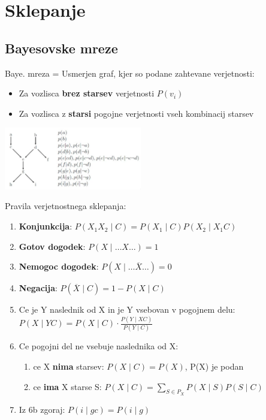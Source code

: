 \section{Sklepanje}

\subsection{Bayesovske mreze}

Baye. mreza = Usmerjen graf, kjer so podane zahtevane verjetnosti:
\begin{itemize}[leftmargin=*,topsep=0pt,noitemsep]
    \item Za vozlisca \textbf{brez starsev} verjetnosti $P(v_i)$
    \item Za vozlisca z \textbf{starsi} pogojne verjetnosti vseh kombinacij starsev
\end{itemize}

\includegraphics[width=6cm]{images/bayesovska_mreza.png}

Pravila verjetnostnega sklepanja:
\begin{enumerate}[leftmargin=*,topsep=0pt,noitemsep]
    \item \textbf{Konjunkcija}: $P(X_1 X_2 \mid C) = P(X_1 \mid C) P(X_2 \mid X_1C)$
    \item \textbf{Gotov dogodek}: $P(X \mid \dots X \dots) = 1$
    \item \textbf{Nemogoc dogodek}: $P(X\mid \dots \overline{X} \dots) = 0$
    \item \textbf{Negacija}: $P(\overline{X} \mid C) = 1 - P(X \mid C)$
    \item Ce je Y naslednik od X in je Y vsebovan v pogojnem delu: $P(X\mid YC) = P(X\mid C) \cdot \frac{P(Y\mid XC)}{P(Y\mid C)}$
    \item Ce pogojni del ne vsebuje naslednika od X:
        \begin{enumerate}[leftmargin=0.1cm,noitemsep,topsep=0pt,label=(\alph*)]
            \item ce X \textbf{nima} starsev: $P(X\mid C) = P(X)$, P(X) je podan
            \item ce \textbf{ima} X starse S: $P(X\mid C) = \sum_{S\in P_X} P(X \mid S)P(S\mid C)$
        \end{enumerate}
    \item Iz 6b zgoraj: $P(i \mid gc) = P(i \mid g)$
\end{enumerate}